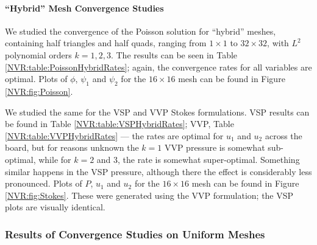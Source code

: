 \paragraph{``Hybrid'' Mesh Convergence Studies}

We studied the convergence of the Poisson solution for ``hybrid'' meshes, containing half triangles and half quads, ranging from $1 \times 1$ to $32 \times 32$, with $L^{2}$ polynomial orders $k=1,2,3$.  The results can be seen in Table \ref{NVR:table:PoissonHybridRates}; again, the convergence rates for all variables are optimal. Plots of $\phi$, $\psi_{1}$ and $\psi_{2}$ for the $16 \times 16$ mesh can be found in Figure \ref{NVR:fig:Poisson}.

We studied the same for the VSP and VVP Stokes formulations.  VSP results can be found in Table \ref{NVR:table:VSPHybridRates}; VVP, Table \ref{NVR:table:VVPHybridRates} --- the rates are optimal for $u_{1}$ and $u_{2}$ across the board, but for reasons unknown the $k=1$ VVP pressure is somewhat sub-optimal, while for $k=2$ and 3, the rate is somewhat super-optimal.  Something similar happens in the VSP pressure, although there the effect is considerably less pronounced.  Plots of $P$, $u_{1}$ and $u_{2}$ for the $16 \times 16$ mesh can be found in Figure \ref{NVR:fig:Stokes}.  These were generated using the VVP formulation; the VSP plots are visually identical.

\clearpage
\subsubsection{Results of Convergence Studies on Uniform Meshes}

\vspace{1.59in}

